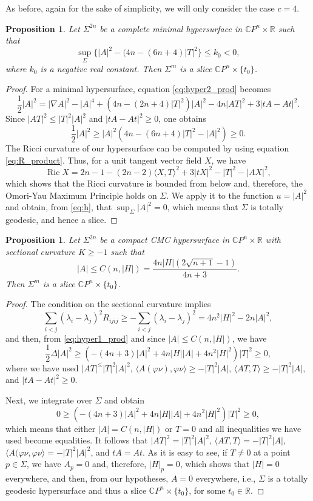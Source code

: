 \documentclass[11pt]{amsart}
\theoremstyle{plain}
\newtheorem{proposition}  [theorem]  {Proposition}
\theoremstyle{definition}
\DeclareMathOperator{\ric}{Ric}
\numberwithin{equation}{section}
\begin{document}
As before, again for the sake of simplicity, we will only consider the case $c=4$.

\begin{proposition} Let $\Sigma^{2n}$ be a complete minimal hypersurface in $\mathbb{C}P^n\times\mathbb{R}$ such that
$$
\sup_{\Sigma}\{|A|^2-(4n-(6n+4)|T|^2\}\leq k_0<0,
$$
where $k_0$ is a negative real constant. Then $\Sigma^m$ is a slice $\mathbb{C}P^n\times\{t_0\}$.
\end{proposition}

\begin{proof} For a minimal hypersurface, equation \eqref{eq:hyper2_prod} becomes
$$
\frac{1}{2}|A|^2=|\nabla A|^2-|A|^4+(4n-(2n+4)|T|^2)|A|^2-4n|AT|^2+3|tA-At|^2.
$$
Since $|AT|^2\leq|T|^2|A|^2$ and $|tA-At|^2\geq 0$, one obtains
\begin{equation}\label{eq:h}
\frac{1}{2}|A|^2\geq |A|^2(4n-(6n+4)|T|^2-|A|^2)\geq 0.
\end{equation}
The Ricci curvature of our hypersurface can be computed by using equation \eqref{eq:R_product}. Thus, for a unit tangent vector field $X$, we have
$$
\ric X=2n-1-(2n-2)\langle X,T\rangle^2+3|tX|^2-|T|^2-|AX|^2,
$$
which shows that the Ricci curvature is bounded from below and, therefore, the Omori-Yau Maximum Principle holds on $\Sigma$. We apply it to the function $u=|A|^2$ and obtain, from \eqref{eq:h}, that $\sup_{\Sigma}|A|^2=0$, which means that $\Sigma$ is totally geodesic, and hence a slice.
\end{proof}

\begin{proposition} Let $\Sigma^{2n}$ be a compact CMC hypersurface in $\mathbb{C}P^n\times\mathbb{R}$ with sectional curvature $K\geq -1$ such that
$$
|A|\leq C(n,|H|)=\frac{4n|H|(2\sqrt{n+1}-1)}{4n+3}.
$$
Then $\Sigma^m$ is a slice $\mathbb{C}P^n\times\{t_0\}$.
\end{proposition} 

\begin{proof} The condition on the sectional curvature implies
$$
\sum_{i<j}(\lambda_i-\lambda_j)^2R_{ijij}\geq-\sum_{i<j}(\lambda_i-\lambda_j)^2=4n^2|H|^2-2n|A|^2,
$$
and then, from \eqref{eq:hyper1_prod} and since $|A|\leq C(n,|H|)$, we have
$$
\frac{1}{2}\Delta|A|^2\geq(-(4n+3)|A|^2+4n|H||A|+4n^2|H|^2)|T|^2\geq 0,
$$
where we have used $|AT|^\leq|T|^2|A|^2$, $\langle A(\varphi\nu),\varphi\nu\rangle\geq-|T|^2|A|$, $\langle AT,T\rangle\geq-|T|^2|A|$, and $|tA-At|^2\geq 0$.

Next, we integrate over $\Sigma$ and obtain
$$
0\geq(-(4n+3)|A|^2+4n|H||A|+4n^2|H|^2)|T|^2\geq 0,
$$
which means that either $|A|=C(n,|H|)$ or $T=0$ and all inequalities we have used become equalities. It follows that $|AT|^2=|T|^2|A|^2$, $\langle AT,T\rangle=-|T|^2|A|$, $\langle A(\varphi\nu,\varphi\nu\rangle=-|T|^2|A|^2$, and $tA=At$. As it is easy to see, if $T\neq 0$ at a point $p\in\Sigma$, we have $A_p=0$ and, therefore, $|H|_p=0$, which shows that $|H|=0$ everywhere, and then, from our hypotheses, $A=0$ everywhere, i.e., $\Sigma$ is a totally geodesic hypersurface and thus a slice $\mathbb{C}P^n\times\{t_0\}$, for some $t_0\in\mathbb{R}$.
\end{proof}
\end{document}

